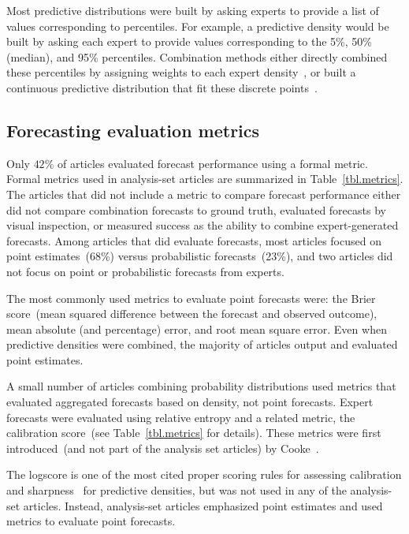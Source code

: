 \documentclass[preprint,authoryear,nonatbib]{elsarticle}
\begin{document}
Most predictive distributions were built by asking experts to provide a list of values corresponding to percentiles.
For example, a predictive density would be built by asking each expert to provide values corresponding to the 5\%, 50\% (median), and 95\% percentiles.
Combination methods either directly combined these percentiles by assigning weights to each expert density~\parencite{ISI:000327676900001,hanea2018value,morales2017characterization,cai2016simple,bolger2017deriving,kabak2008aggregating,zio1997accounting,brito2016bayesian}, or built a continuous predictive distribution that fit these discrete points~\parencite{brito2012behavioral,abramson1996hailfinder,neves2008life,failing2004using,wang2008probabilistic,kurowicka2010probabilistic}.

\subsection{Forecasting evaluation metrics}
Only $42$\% of articles evaluated forecast performance using a formal metric.
Formal metrics used in analysis-set articles are summarized in Table~\ref{tbl.metrics}.
The articles that did not include a metric to compare forecast performance either did not compare combination forecasts to ground truth, evaluated forecasts by visual inspection, or measured success as the ability to combine expert-generated forecasts.
Among articles that did evaluate forecasts, most articles focused on point estimates~(68\%) versus probabilistic forecasts~(23\%), and two articles did not focus on point or probabilistic forecasts from experts.

The most commonly used metrics to evaluate point forecasts were: the Brier score~(mean squared difference between the forecast and observed outcome), mean absolute (and percentage) error, and root mean square error.
Even when predictive densities were combined, the majority of articles output and evaluated point estimates.

A small number of articles combining probability distributions used metrics that evaluated aggregated forecasts based on density, not point forecasts.
Expert forecasts were evaluated using relative entropy and a related metric, the calibration score~(see Table~\ref{tbl.metrics} for details).
These metrics were first introduced~(and not part of the analysis set articles) by Cooke~\parencite{cooke1988calibration,cooke1991experts}.

The logscore is one of the most cited proper scoring rules for assessing calibration and sharpness~\parencite{gneiting2007strictly,gneiting2011comparing,hora2015calibration} for predictive densities, but was not used in any of the analysis-set articles.
Instead, analysis-set articles emphasized point estimates and used metrics to evaluate point forecasts.
\end{document}
